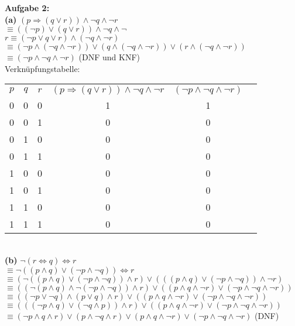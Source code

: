 \documentclass[a4paper]{scrartcl}
\begin{document}
	\begin{flushleft}
		\textbf{Aufgabe 2:}\\
		\textbf{(a)} 
		$(p\Rightarrow(q\vee r))\wedge \neg q\wedge\neg r $\\
		$\equiv ((\neg p)\vee (q\vee r))\wedge \neg q\wedge\neg $\\
		$r\equiv (\neg p\vee  q\vee r)\wedge (\neg q\wedge\neg r)$\\
		$\equiv  (\neg p\wedge (\neg q\wedge\neg r))\vee (q\wedge (\neg q\wedge\neg r))\vee (r\wedge (\neg q\wedge\neg r))$\\
		$\equiv (\neg p\wedge \neg q\wedge\neg r)$ (DNF und KNF)\\[1em]
		Verknüpfungstabelle: \\
		\begin{tabular}{|c|c|c|c|c|c|}
			$p$ & $q$ & $r$ & $(p\Rightarrow(q\vee r))\wedge \neg q\wedge\neg r$ & $(\neg p\wedge \neg q\wedge\neg r)$\\
			0 & 0 & 0 & 1 & 1 \\
			0 & 0 & 1 & 0 & 0 \\
			0 & 1 & 0 & 0 & 0 \\
			0 & 1 & 1 & 0 & 0 \\
			1 & 0 & 0 & 0 & 0 \\
			1 & 0 & 1 & 0 & 0 \\
			1 & 1 & 0 & 0 & 0 \\
			1 & 1 & 1 & 0 & 0 \\
		 \end{tabular}\\[1em]
		 \textbf{(b)} 
		 $\neg (r\Leftrightarrow q) \Leftrightarrow r$\\
		 $\equiv \neg((p\wedge q)\vee(\neg p\wedge \neg q))\Leftrightarrow r$\\
		 $\equiv (\neg((p\wedge q)\vee(\neg p\wedge \neg q))\wedge r)\vee(((p\wedge q)\vee(\neg p\wedge \neg q))\wedge\neg r)$\\
		 $\equiv ((\neg(p\wedge q)\wedge\neg(\neg p\wedge\neg q))\wedge r)\vee((p\wedge q\wedge\neg r)\vee(\neg p\wedge\neg q\wedge\neg r))$\\
		 $\equiv ((\neg p\vee \neg q)\wedge(p\vee q)\wedge r)\vee ((p\wedge q\wedge\neg r)\vee(\neg p\wedge\neg q\wedge\neg r))$\\
		 $\equiv (((\neg p\wedge q)\vee(\neg q\wedge p))\wedge r) \vee ((p\wedge q\wedge\neg r)\vee(\neg p\wedge\neg q\wedge\neg r))$\\
		 $\equiv (\neg p\wedge q\wedge r)\vee(p\wedge\neg q\wedge r)\vee(p\wedge q\wedge\neg r)\vee(\neg p\wedge\neg q\wedge\neg r)$ (DNF)\\[1em]

\end{flushleft}
\end{document}
